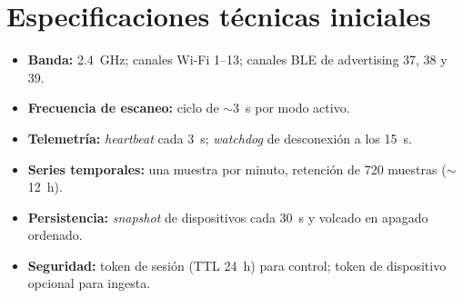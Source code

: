 \section{Especificaciones técnicas iniciales}
\begin{itemize}[leftmargin=1.4em]
  \item \textbf{Banda:} 2.4~GHz; canales Wi-Fi 1--13; canales BLE de advertising 37, 38 y 39.
  \item \textbf{Frecuencia de escaneo:} ciclo de $\sim$3~s por modo activo.
  \item \textbf{Telemetría:} \emph{heartbeat} cada 3~s; \emph{watchdog} de desconexión a los 15~s.
  \item \textbf{Series temporales:} una muestra por minuto, retención de 720 muestras ($\sim$12~h).
  \item \textbf{Persistencia:} \emph{snapshot} de dispositivos cada 30~s y volcado en apagado ordenado.
  \item \textbf{Seguridad:} token de sesión (TTL 24~h) para control; token de dispositivo opcional para ingesta.
\end{itemize}
